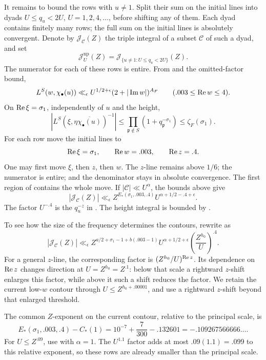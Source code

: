 It remains to bound the rows with \(u\ne1\).  Split their sum on the
initial lines into dyads \(U\le q_u<2U\), \(U=1,2,4,\ldots\), before
shifting any of them.  Each dyad contains finitely many rows; the full
sum on the initial lines is absolutely convergent.  Denote by
\(\mathcal J_{\mathcal C}(Z)\) the triple integral of a subset
\(\mathcal C\) of such a dyad, and set
\[
 \mathcal J_U^{\mathrm{np}}(Z)
   =\mathcal J_{\{u\ne1:U\le q_u<2U\}}(Z).
\]
The numerator for each of these rows
is entire.  From  and the
omitted-factor bound,
\begin{equation}
 L^S(w,\chi_\bullet(u))
       \ll_\epsilon U^{1/2+\epsilon}(2+|\operatorname{Im} w|)^{A_F}
 \qquad(.003\le\operatorname{Re} w\le4).
\label{eq:numerator-convexity}
\end{equation}
On \(\operatorname{Re}\xi=\sigma_1\), independently of \(u\) and the height,
\[
 |L^S(\xi,\eta\overline{\chi_\bullet(u)})^{-1}|
       \le\prod_{\mathfrak p\notin S}(1+q_{\mathfrak p}^{-\sigma_1})
       \le\zeta_F(\sigma_1).
\]
For each row move the initial lines to
\[
 \operatorname{Re}\xi=\sigma_1,\qquad \operatorname{Re} w=.003,\qquad \operatorname{Re} z=.4.
\]
One may first move \(\xi\), then \(z\), then \(w\).
The \(z\)-line remains above \(1/6\); the numerator is entire; and the
denominator stays in absolute convergence.  The first region of
 contains the whole move.  If
\(|\mathcal C|\ll U^\alpha\), the bounds above give
\begin{equation}
 |\mathcal J_{\mathcal C}(Z)|
       \ll_\epsilon
       Z^{E_*(\sigma_1,.003,.4)}
       U^{\alpha+1/2-.4+\epsilon}.
\label{eq:dyadic-contour-bound}
\end{equation}
The factor \(U^{-.4}\) is the \(q_u^{-z}\) in
.  The height integral is bounded by
.

To see how the size of the frequency determines the contours, rewrite
 as
\[
 |\mathcal J_{\mathcal C}(Z)|
 \ll_\epsilon
 Z^{a/2+\sigma_1-1+b(.003-1)}
 U^{\alpha+1/2+\epsilon}
       \left(\frac{Z^{h_0}}U\right)^{.4}.
\]
For a general \(z\)-line, the corresponding factor is
\((Z^{h_0}/U)^{\operatorname{Re} z}\).  Its dependence on \(\operatorname{Re} z\) changes direction
at \(U=Z^{h_0}=Z^{.1}\): below that scale a rightward \(z\)-shift enlarges
this factor, while above it such a shift reduces the factor.  We retain
the current low-\(w\) contour through \(U\le Z^{h_0+.00001}\), and use
a rightward \(z\)-shift beyond that enlarged threshold.

The common \(Z\)-exponent on the current contour, relative to the
principal scale, is
\[
 E_*(\sigma_1,.003,.4)-C_*(1)
     =10^{-7}+\frac7{300}-.132601
     =-.109267566666\ldots .
\]
For \(U\le Z^{.09}\), use  with
\(\alpha=1\).  The \(U^{1.1}\) factor adds at most
\(.09(1.1)=.099\) to this relative exponent, so these rows are already
smaller than the principal scale.

